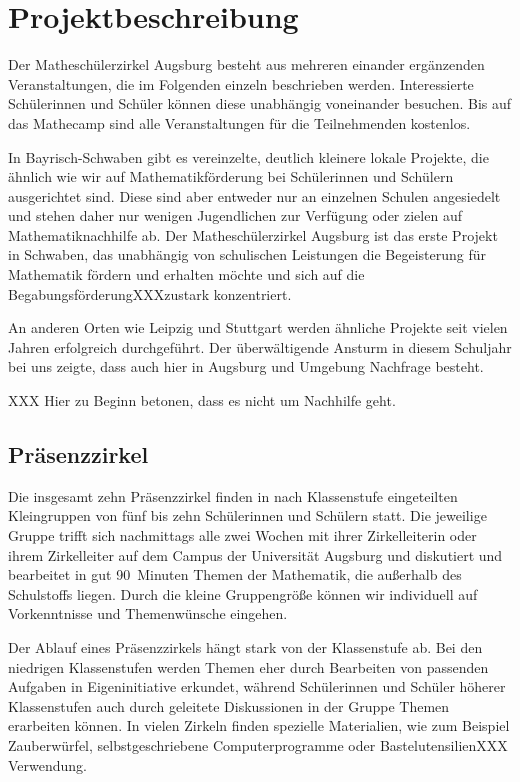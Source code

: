 \documentclass[12pt]{zettel}
\begin{document}
\section{Projektbeschreibung}

Der Matheschülerzirkel Augsburg besteht aus mehreren einander ergänzenden Veranstaltungen, die im
Folgenden einzeln beschrieben werden. Interessierte Schülerinnen und Schüler
können diese unabhängig voneinander besuchen. Bis auf das Mathecamp sind alle
Veranstaltungen für die Teilnehmenden kostenlos.

In Bayrisch-Schwaben gibt es vereinzelte, deutlich kleinere lokale
Projekte, die ähnlich wie wir auf Mathematikförderung bei Schülerinnen und
Schülern ausgerichtet sind. Diese sind aber entweder nur an einzelnen Schulen
angesiedelt und stehen daher nur wenigen Jugendlichen zur Verfügung oder zielen
auf Mathematiknachhilfe ab. Der Matheschülerzirkel Augsburg ist das erste
Projekt in Schwaben, das unabhängig von schulischen Leistungen die
Begeisterung für Mathematik fördern und erhalten möchte und sich auf die
BegabungsförderungXXXzustark konzentriert.

An anderen Orten wie Leipzig und Stuttgart werden ähnliche Projekte seit
vielen Jahren erfolgreich durchgeführt. Der überwältigende Ansturm in
diesem Schuljahr bei uns zeigte, dass auch hier in Augsburg und Umgebung Nachfrage
besteht.

XXX Hier zu Beginn betonen, dass es nicht um Nachhilfe geht.


\subsection{Präsenzzirkel}

Die insgesamt zehn Präsenzzirkel finden in nach Klassenstufe eingeteilten
Kleingruppen von fünf bis zehn Schülerinnen und Schülern statt.
Die jeweilige Gruppe trifft sich nachmittags alle zwei Wochen mit ihrer Zirkelleiterin oder ihrem
Zirkelleiter auf dem Campus der Universität Augsburg und diskutiert und
bearbeitet in gut 90~Minuten Themen der Mathematik, die außerhalb des
Schulstoffs liegen. Durch die kleine Gruppengröße können wir individuell auf
Vorkenntnisse und Themenwünsche eingehen.

Der Ablauf eines Präsenzzirkels hängt stark von der Klassenstufe ab. Bei den
niedrigen Klassenstufen werden Themen eher durch Bearbeiten von passenden
Aufgaben in Eigeninitiative erkundet, während Schülerinnen und Schüler höherer
Klassenstufen auch durch geleitete Diskussionen in der Gruppe
Themen erarbeiten können. In vielen Zirkeln finden spezielle Materialien,
wie zum Beispiel Zauberwürfel, selbstgeschriebene Computerprogramme oder
BastelutensilienXXX Verwendung.
\end{document}
